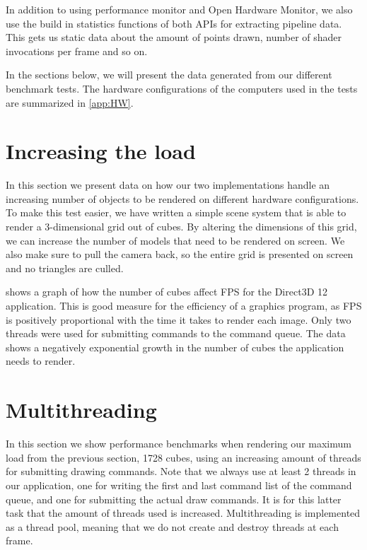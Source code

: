 In addition to using performance monitor and Open Hardware Monitor, we also use the build in statistics functions of both \glspl{API} for extracting pipeline data. 
This gets us static data about the amount of points drawn, number of shader invocations per frame and so on.


In the sections below, we will present the data generated from our different benchmark tests. The hardware configurations of the computers used in the tests are summarized in \cref{app:HW}. 

\section{Increasing the load}
In this section we present data on how our two implementations handle an increasing number of objects to be rendered on different hardware configurations. 
To make this test easier, we have written a simple scene system that is able to render a 3-dimensional grid out of cubes.
By altering the dimensions of this grid, we can increase the number of models that need to be rendered on screen. We also make sure to pull the camera back, so the entire grid is presented on screen and no triangles are culled. 


 shows a graph of how the number of cubes affect \gls{FPS} for the Direct3D 12 application.
This is good measure for the efficiency of a graphics program, as \gls{FPS} is positively proportional with the time it takes to render each image. 
Only two threads were used for submitting commands to the command queue.
The data shows a negatively exponential growth in the number of cubes the application needs to render. 
 
 

\section{Multithreading}
In this section we show performance benchmarks when rendering our maximum load from the previous section, 1728 cubes, using an increasing amount of threads for submitting drawing commands.
Note that we always use at least 2 threads in our application, one for writing the first and last command list of the command queue, and one for submitting the actual draw commands.
It is for this latter task that the amount of threads used is increased. 
Multithreading is implemented as a thread pool, meaning that we do not create and destroy threads at each frame.


